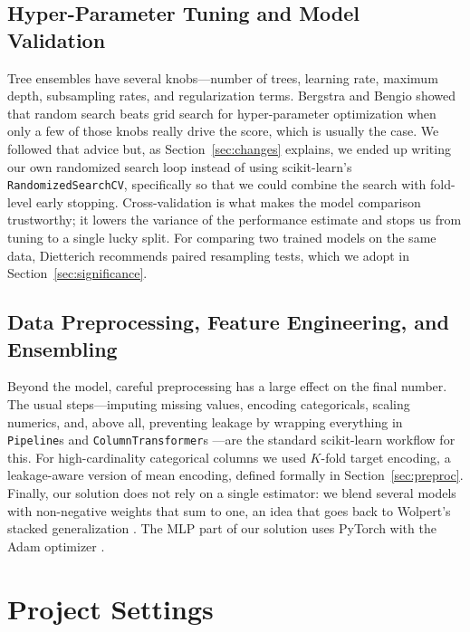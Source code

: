 \documentclass[journal]{IEEEtran}
\begin{document}
\subsection{Hyper-Parameter Tuning and Model Validation}
Tree ensembles have several knobs---number of trees, learning rate, maximum
depth, subsampling rates, and regularization terms. Bergstra and Bengio
\cite{bergstra2012random} showed that random search beats grid search for
hyper-parameter optimization when only a few of those knobs really drive the
score, which is usually the case. We followed that advice but, as
Section~\ref{sec:changes} explains, we ended up writing our own randomized
search loop instead of using scikit-learn's \texttt{RandomizedSearchCV},
specifically so that we could combine the search with fold-level early stopping.
Cross-validation is what makes the model comparison trustworthy; it
lowers the variance of the performance estimate and stops us from tuning to a
single lucky split. For comparing two trained models on the same data,
Dietterich \cite{dietterich1998} recommends paired resampling tests, which we
adopt in Section~\ref{sec:significance}.

\subsection{Data Preprocessing, Feature Engineering, and Ensembling}
Beyond the model, careful preprocessing has a large effect on the final number.
The usual steps---imputing missing values, encoding categoricals, scaling
numerics, and, above all, preventing leakage by wrapping everything in
\texttt{Pipeline}s and \texttt{ColumnTransformer}s
\cite{pedregosa2011sklearn}---are the standard scikit-learn workflow for this.
For high-cardinality categorical columns we used $K$-fold target encoding, a
leakage-aware version of mean encoding, defined formally in
Section~\ref{sec:preproc}. Finally, our solution does not rely on a single
estimator: we blend several models with non-negative weights that sum to one, an
idea that goes back to Wolpert's stacked generalization \cite{wolpert1992stacked}.
The MLP part of our solution uses PyTorch \cite{paszke2019pytorch} with the Adam
optimizer \cite{kingma2015adam}.

\section{Project Settings}
\label{sec:settings}
\end{document}
